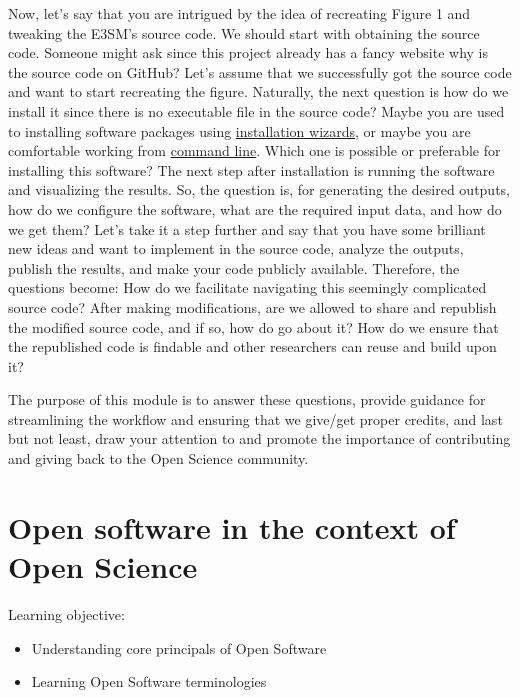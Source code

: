 \documentclass[
  letterpaper,
  DIV=11,
  numbers=noendperiod]{scrreport}
\providecommand{\tightlist}{%
  \setlength{\itemsep}{0pt}\setlength{\parskip}{0pt}}\usepackage{longtable,booktabs,array}
\begin{document}
Now, let's say that you are intrigued by the idea of recreating Figure 1
and tweaking the E3SM's source code. We should start with obtaining the
source code. Someone might ask since this project already has a fancy
website why is the source code on GitHub? Let's assume that we
successfully got the source code and want to start recreating the
figure. Naturally, the next question is how do we install it since there
is no executable file in the source code? Maybe you are used to
installing software packages using
\href{https://en.wikipedia.org/wiki/Wizard_(software)}{installation
wizards}, or maybe you are comfortable working from
\href{https://en.wikipedia.org/wiki/Command-line_interface}{command
line}. Which one is possible or preferable for installing this software?
The next step after installation is running the software and visualizing
the results. So, the question is, for generating the desired outputs,
how do we configure the software, what are the required input data, and
how do we get them? Let's take it a step further and say that you have
some brilliant new ideas and want to implement in the source code,
analyze the outputs, publish the results, and make your code publicly
available. Therefore, the questions become: How do we facilitate
navigating this seemingly complicated source code? After making
modifications, are we allowed to share and republish the modified source
code, and if so, how do go about it? How do we ensure that the
republished code is findable and other researchers can reuse and build
upon it?

The purpose of this module is to answer these questions, provide
guidance for streamlining the workflow and ensuring that we give/get
proper credits, and last but not least, draw your attention to and
promote the importance of contributing and giving back to the Open
Science community.

\hypertarget{open-software-in-the-context-of-open-science}{%
\chapter{Open software in the context of Open
Science}\label{open-software-in-the-context-of-open-science}}

Learning objective:

\begin{itemize}
\tightlist
\item
  Understanding core principals of Open Software
\item
  Learning Open Software terminologies
\end{itemize}
\end{document}
